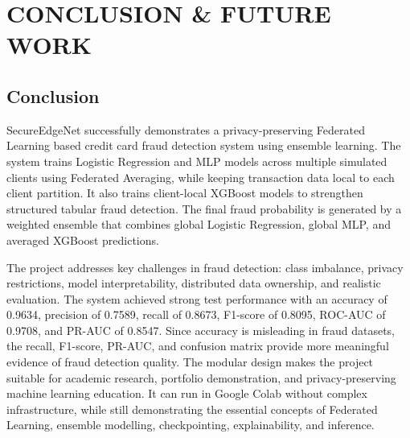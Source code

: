 \chapter{CONCLUSION \& FUTURE WORK}
\section{Conclusion}
SecureEdgeNet successfully demonstrates a privacy-preserving Federated Learning based credit card fraud detection system using ensemble learning. The system trains Logistic Regression and MLP models across multiple simulated clients using Federated Averaging, while keeping transaction data local to each client partition. It also trains client-local XGBoost models to strengthen structured tabular fraud detection. The final fraud probability is generated by a weighted ensemble that combines global Logistic Regression, global MLP, and averaged XGBoost predictions.

The project addresses key challenges in fraud detection: class imbalance, privacy restrictions, model interpretability, distributed data ownership, and realistic evaluation. The system achieved strong test performance with an accuracy of 0.9634, precision of 0.7589, recall of 0.8673, F1-score of 0.8095, ROC-AUC of 0.9708, and PR-AUC of 0.8547. Since accuracy is misleading in fraud datasets, the recall, F1-score, PR-AUC, and confusion matrix provide more meaningful evidence of fraud detection quality. The modular design makes the project suitable for academic research, portfolio demonstration, and privacy-preserving machine learning education. It can run in Google Colab without complex infrastructure, while still demonstrating the essential concepts of Federated Learning, ensemble modelling, checkpointing, explainability, and inference.

\vspace{30mm}

